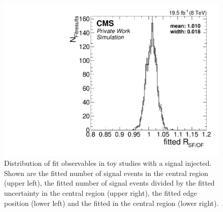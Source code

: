 \begin{figure}[hbp]
\begin{minipage}[t]{0.49\textwidth}
  \end{minipage}
  \begin{minipage}[t]{0.49\textwidth}
    \includegraphics[width=\textwidth]{plots/results/fit/toyResults/rSFOF_signalInjected.pdf}
  \end{minipage}
  \caption{Distribution of fit observables in toy studies with a signal injected. Shown are the fitted number of signal events in the central region (upper left), the fitted number of signal events divided by the fitted uncertainty in the central region (upper right), the fitted edge position (lower left) and the fitted \Rsfof in the central region (lower right).}
  \label{fig:toys:signalInjected}
\end{figure}

